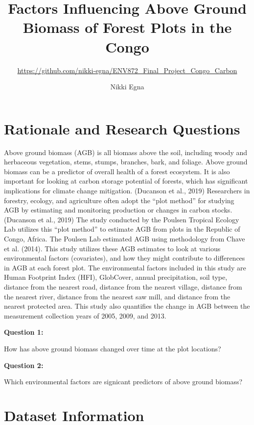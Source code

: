 \documentclass[12pt,]{article}
\title{Factors Influencing Above Ground Biomass of Forest Plots in the Congo}
\subtitle{\url{https://github.com/nikki-egna/ENV872_Final_Project_Congo_Carbon}}
\author{Nikki Egna}
\date{}
\begin{document}
\maketitle

\newpage
\tableofcontents 
\newpage
\listoffigures

\newpage

\hypertarget{rationale-and-research-questions}{%
\section{Rationale and Research
Questions}\label{rationale-and-research-questions}}

Above ground biomass (AGB) is all biomass above the soil, including
woody and herbaceous vegetation, stems, stumps, branches, bark, and
foliage. Above ground biomass can be a predictor of overall health of a
forest ecosystem. It is also important for looking at carbon storage
potential of forests, which has significant implications for climate
change mitigation. (Ducanson et al., 2019) Researchers in forestry,
ecology, and agriculture often adopt the ``plot method'' for studying
AGB by estimating and monitoring production or changes in carbon stocks.
(Ducanson et al., 2019) The study conducted by the Poulsen Tropical
Ecology Lab utilizes this ``plot method'' to estimate AGB from plots in
the Republic of Congo, Africa. The Poulsen Lab estimated AGB using
methodology from Chave et al. (2014). This study utilizes these AGB
estimates to look at various environmental factors (covariates), and how
they might contribute to differences in AGB at each forest plot. The
environmental factors included in this study are Human Footprint Index
(HFI), GlobCover, annual precipitation, soil type, distance from the
nearest road, distance from the nearest village, distance from the
nearest river, distance from the nearest saw mill, and distance from the
nearest protected area. This study also quantifies the change in AGB
between the measurement collection years of 2005, 2009, and 2013.

\textbf{Question 1:}

How has above ground biomass changed over time at the plot locations?

\textbf{Question 2:}

Which environmental factors are signicant predictors of above ground
biomass?

\newpage

\hypertarget{dataset-information}{%
\section{Dataset Information}\label{dataset-information}}
\end{document}
